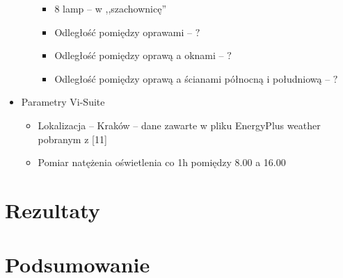 \documentclass[a4paper,12pt]{article}
\begin{document}
\begin{itemize}
\begin{itemize}
			\begin{itemize}
				\item 8 lamp -- w ,,szachownicę''
				\item Odległość pomiędzy oprawami -- $?$
				\item Odległość pomiędzy oprawą a oknami -- $?$
				\item Odległość pomiędzy oprawą a ścianami północną i południową -- $?$
			\end{itemize}
		\end{itemize}
		\item Parametry Vi-Suite
		\begin{itemize}
			\item Lokalizacja -- Kraków -- dane zawarte w pliku EnergyPlus weather pobranym z [11]
			\item Pomiar natężenia oświetlenia co 1h pomiędzy 8.00 a 16.00
		\end{itemize}		
		
	\end{itemize}

	\section{Rezultaty}
	\label{sec:rezultaty}

	\section{Podsumowanie}
	\label{sec:podsumowanie}		

	
\end{document}
